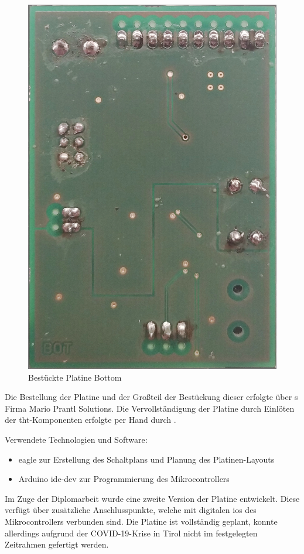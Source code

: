 \begin{center}
\begin{minipage}[t]{0.475\linewidth}
\begin{figure}[H]
			\includegraphics[width=\textwidth]{images/projektergebnis/platineV1bot.jpg}
			\caption{Bestückte Platine Bottom}
		\end{figure}
	\end{minipage}
\end{center}

Die Bestellung der Platine und der Großteil der Bestückung dieser erfolgte über \MarioPrantl s Firma Mario Prantl Solutions.
Die Vervollständigung der Platine durch Einlöten der \ac{tht}-Komponenten erfolgte per Hand durch \MatthiasMair.

Verwendete Technologien und Software:
\begin{itemize}
    \item \ac{eagle} zur Erstellung des Schaltplans und Planung des Platinen-Layouts
    \item Arduino \ac{ide-dev} zur Programmierung des Mikrocontrollers
\end{itemize}

Im Zuge der Diplomarbeit wurde eine zweite Version der Platine entwickelt.
Diese verfügt über zusätzliche Anschlusspunkte, welche mit digitalen \acp{io} des Mikrocontrollers verbunden sind.
Die Platine ist vollständig geplant, konnte allerdings aufgrund der COVID-19-Krise in Tirol nicht im festgelegten Zeitrahmen gefertigt werden.